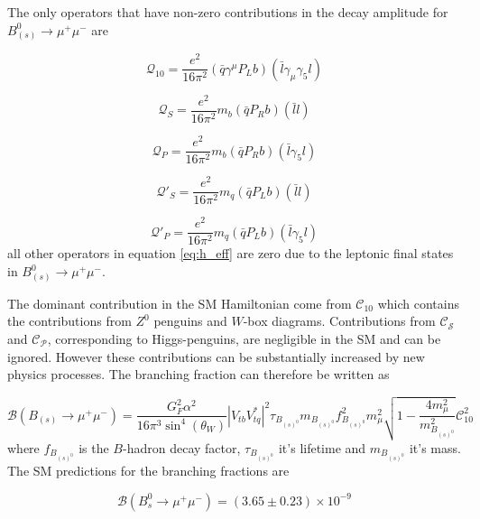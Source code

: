 The only operators that have non-zero contributions in the decay amplitude for $B_{(s)}^{0} \to \mu^{+} \mu^{-}$ are

\begin{equation}
 \mathcal{Q}_{10} = \frac{e^{2}}{16 \pi^{2}}(\bar{q}\gamma^{\mu}P_{L}b)(\bar{l}\gamma_{\mu}\gamma_{5}l)
\end{equation}

\begin{equation}
 \mathcal{Q}_{S} = \frac{e^{2}}{16 \pi^{2}}m_{b}(\bar{q}P_{R}b)(\bar{l}l)
\end{equation}

\begin{equation}
 \mathcal{Q}_{P} =\frac{e^{2}}{16 \pi^{2}} m_{b}(\bar{q}P_{R}b)(\bar{l}\gamma_{5}l)
\end{equation}


\begin{equation}
 \mathcal{Q}'_{S} = \frac{e^{2}}{16 \pi^{2}}m_{q}(\bar{q}P_{L}b)(\bar{l}l)
\end{equation}

\begin{equation}
 \mathcal{Q}'_{P} =\frac{e^{2}}{16 \pi^{2}} m_{q}(\bar{q}P_{L}b)(\bar{l}\gamma_{5}l)
\end{equation}
all other operators in equation \eqref{eq:h_eff} are zero due to the leptonic final states in $B_{(s)}^{0} \to \mu^{+} \mu^{-}$.

The dominant contribution in the SM Hamiltonian come from $\mathcal{C}_{10}$ which contains the contributions from $Z^{0}$ penguins and
$W$-box diagrams. Contributions from $\mathcal{C_{S}}$ and $\mathcal{C_{P}}$, corresponding to Higgs-penguins, are negligible in the SM and can be ignored. However these contributions can be substantially 
increased by new physics processes. The branching fraction can therefore be written as \cite{Bettler:1257978}

 $$\mathcal{B}(B_{(s)}\to \mu^{+}\mu^{-}) = \frac{G_{F}^{2}\alpha^{2}}{16\pi^{3}\sin^{4}(\theta_{W})}|V_{tb}V_{tq}^{*}|^{2} \tau_{B_{(s)^{0}}}m_{B_{(s)^{0}}}f_{B_{(s)^{0}}}^{2}m_{\mu}^{2}\sqrt{1-\frac{4m_{\mu}^{2}}{m_{B_{(s)^{0}}}^{2}}}\mathcal{C}_{10}^{2}$$
where $f_{B_{(s)^{0}}}$ is the $B$-hadron decay factor, $\tau_{B_{(s)^{0}}}$ it's lifetime and $m_{B_{(s)^{0}}}$ it's mass.
The SM predictions for the branching fractions are \cite{Bobeth:2013uxa} 

$$ \mathcal{B}(B_{s}^{0} \to \mu^{+} \mu^{-}) = (3.65\pm0.23)\times 10^{-9}$$

